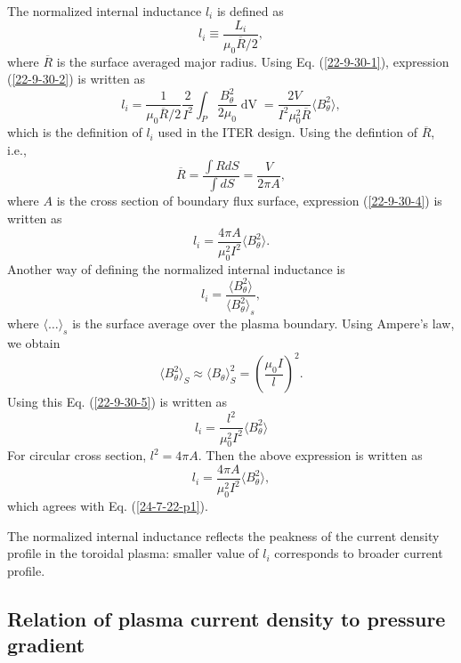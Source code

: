 \documentclass{llncs}
\newcommand{\tmop}[1]{\ensuremath{\operatorname{#1}}}
\begin{document}
The normalized internal inductance $l_i$ is defined as
\begin{equation}
  \label{22-9-30-2} l_i \equiv \frac{L_i}{\mu_0 \overline{R} / 2},
\end{equation}
where $\overline{R}$ is the surface averaged major radius. Using Eq.
(\ref{22-9-30-1}), expression (\ref{22-9-30-2}) is written as
\begin{equation}
  \label{22-9-30-4} l_i = \frac{1}{\mu_0 \overline{R} / 2}  \frac{2}{I^2}
  \int_P \frac{B^2_{\theta}}{2 \mu_0} \tmop{dV} = \frac{2 V}{I^2 \mu_0^2
  \overline{R}} \langle B_{\theta}^2 \rangle,
\end{equation}
which is the definition of $l_i$ used in the ITER design. Using the defintion
of $\overline{R}$, i.e.,
\begin{equation}
  \overline{R} = \frac{\int R d S}{\int d S} = \frac{V}{2 \pi A},
\end{equation}
where $A$ is the cross section of boundary flux surface, expression
(\ref{22-9-30-4}) is written as
\begin{equation}
  \label{24-7-22-p1} l_i = \frac{4 \pi A}{\mu_0^2 I^2} \langle B_{\theta}^2
  \rangle .
\end{equation}
Another way of defining the normalized internal inductance is
\begin{equation}
  \label{22-9-30-5} l_i = \frac{\langle B_{\theta}^2 \rangle}{\langle
  B_{\theta}^2 \rangle_s},
\end{equation}
where $\langle \ldots \rangle_s$ is the surface average over the plasma
boundary. Using Ampere's law, we obtain
\begin{equation}
  \langle B_{\theta}^2 \rangle_S \approx \langle B_{\theta} \rangle_S^2 =
  \left( \frac{\mu_0 I}{l} \right)^2 .
\end{equation}
Using this Eq. (\ref{22-9-30-5}) is written as
\begin{equation}
  l_i = \frac{l^2}{\mu_0^2 I^2} \langle B_{\theta}^2 \rangle
\end{equation}
For circular cross section, $l^2 = 4 \pi A$. Then the above expression is
written as
\[ l_i = \frac{4 \pi A}{\mu_0^2 I^2} \langle B_{\theta}^2 \rangle, \]
which agrees with Eq. (\ref{24-7-22-p1}).

The normalized internal inductance reflects the peakness of the current
density profile in the toroidal plasma: smaller value of $l_i$ corresponds to
broader current profile.

\subsection{Relation of plasma current density to pressure
gradient}\label{20-4-23-a1}
\end{document}
